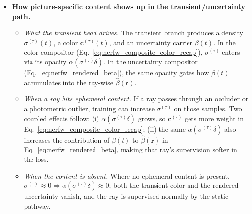 \begin{enrichment}
\begin{enrichment}
\begin{itemize}[leftmargin=*,itemsep=0.25em]
            \item \textbf{How picture-specific content shows up in the transient/uncertainty path.}
            \begin{itemize}[leftmargin=1.25em,itemsep=0.15em]
                \item \emph{What the transient head drives.} The transient branch produces a density \(\sigma^{(\tau)}(t)\), a color \(\mathbf{c}^{(\tau)}(t)\), and an uncertainty carrier \(\beta(t)\). In the color compositor (Eq.~\eqref{eq:nerfw_composite_color_recap}), \(\sigma^{(\tau)}\) enters via its opacity \(\alpha(\sigma^{(\tau)}\delta)\). In the uncertainty compositor (Eq.~\eqref{eq:nerfw_rendered_beta}), the same opacity gates how \(\beta(t)\) accumulates into the ray-wise \(\hat{\beta}(\mathbf{r})\).
                \item \emph{When a ray hits ephemeral content.} If a ray passes through an occluder or a photometric outlier, training can increase \(\sigma^{(\tau)}\) on those samples. Two coupled effects follow: (i) \(\alpha(\sigma^{(\tau)}\delta)\) grows, so \(\mathbf{c}^{(\tau)}\) gets more weight in Eq.~\eqref{eq:nerfw_composite_color_recap}; (ii) the same \(\alpha(\sigma^{(\tau)}\delta)\) also increases the contribution of \(\beta(t)\) to \(\hat{\beta}(\mathbf{r})\) in Eq.~\eqref{eq:nerfw_rendered_beta}, making that ray’s supervision softer in the loss.
                \item \emph{When the content is absent.} Where no ephemeral content is present, \(\sigma^{(\tau)}\!\approx\!0\Rightarrow \alpha(\sigma^{(\tau)}\delta)\!\approx\!0\); both the transient color and the rendered uncertainty vanish, and the ray is supervised normally by the static pathway.
            \end{itemize}
            

\end{itemize}
\end{enrichment}
\end{enrichment}
